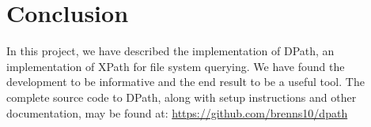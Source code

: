 \documentclass{article}
\begin{document}
\section{Conclusion}

In this project, we have described the implementation of DPath, an
implementation of XPath for file system querying. We have found the development
to be informative and the end result to be a useful tool. The complete source
code to DPath, along with setup instructions and other documentation, may be
found at: \url{https://github.com/brenns10/dpath}



\end{document}
